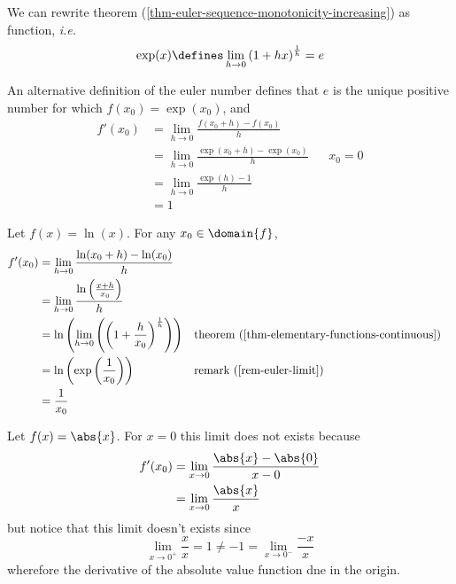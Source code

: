 \begin{rem}\label{rem-euler-limit}
	We can rewrite theorem (\ref{thm-euler-sequence-monotonicity-increasing}) as
	function, \textit{i.e.}
	\begin{equation}
		\exp(x)\defines\lim_{h \to 0}\left(1+hx\right)^\frac{1}{h}=e
	\end{equation}
\end{rem}

\begin{definition}\label{def-euler-alt}
	An alternative definition of the euler number defines that $e$ is the unique
	positive number for which $f(x_0)=\exp(x_0)$, and
	\begin{align}
		f'(x_0) & = \lim_{h\to0}\frac{f(x_0+h)-f(x_0)}{h}\nonumber                          \\
		        & = \lim_{h\to0}\frac{\exp(x_0+h)-\exp(x_0)}{h}         &  & x_0=0\nonumber \\
		        & = \lim_{h\to0}\frac{\exp(h)-1}{h}\label{eq-euler-alt}                     \\
		        & = 1\nonumber
	\end{align}
\end{definition}

\begin{exm}\label{exm-derivatives:6}
	Let $f(x)=\ln(x)$. For any $x_0\in\domain{f}$,
	\begin{align*}
		f^\prime(x_0) & = \lim_{h \to 0}\frac{\ln(x_0+h)-\ln(x_0)}{h}                                                                                                           \\
		              & = \lim_{h \to 0}\frac{\ln\left(\frac{x+h}{x_0}\right)}{h}                                                                                               \\
		              & = \ln\left(\lim_{h \to 0}\left(\left(1+\frac{h}{x_0}\right)^{\frac{1}{h}}\right)\right) &  & \text{\pref{theorem}{thm-elementary-functions-continuous}} \\
		              & = \ln\left(\exp\left(\frac{1}{x_0}\right)\right)                                        &  & \text{\pref{remark}{rem-euler-limit}}                      \\
		              & = \frac{1}{x_0}
	\end{align*}
\end{exm}

\begin{exm}\label{exm-derivatives:7}
	Let $f(x)=\abs{x}$. For $x=0$ this limit does not exists because
	\begin{align*}
		f^\prime(x_0) & = \lim_{x \to 0}\frac{\abs{x}-\abs{0}}{x-0} \\
		              & = \lim_{x \to 0}\frac{\abs{x}}{x}
	\end{align*}
	but notice that this limit doesn't exists since
	\begin{equation*}
		\lim_{x \to 0^+}\frac{x}{x} = 1 \neq -1 = \lim_{x \to 0^-}\frac{-x}{x}
	\end{equation*}
	wherefore the derivative of the absolute value function \gls{dne} in the origin.
\end{exm}

